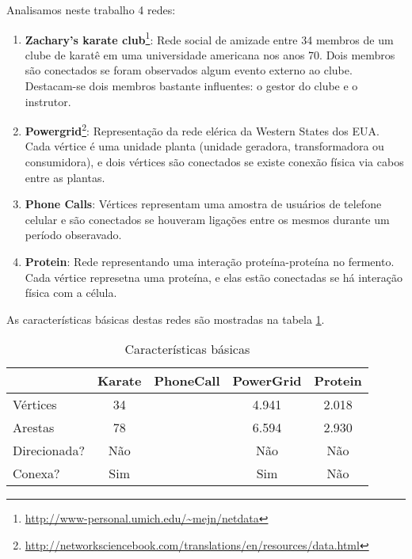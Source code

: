 \documentclass[12pt,a4paper]{article}
\begin{document}
	Analisamos neste trabalho 4 redes:
	\begin{enumerate}
		\item \textbf{Zachary's karate club}\footnote{\url{http://www-personal.umich.edu/~mejn/netdata}}: Rede social de amizade entre 34 membros de um clube de karatê em uma universidade americana nos anos 70. Dois membros são conectados se foram observados algum evento externo ao clube. Destacam-se dois membros bastante influentes: o gestor do clube e o instrutor.
		
		\item \textbf{Powergrid}\footnote{\url{http://networksciencebook.com/translations/en/resources/data.html}}: Representação da rede elérica da Western States dos EUA. Cada vértice é uma unidade planta (unidade geradora, transformadora ou consumidora), e dois vértices são conectados se existe conexão física via cabos entre as plantas.
		
		\item \textbf{Phone Calls}\footnotemark[2]: Vértices representam uma amostra de usuários de telefone celular e são conectados se houveram ligações entre os mesmos durante um período obseravado.

		\item \textbf{Protein}\footnotemark[2]: Rede representando uma interação proteína-proteína no fermento. Cada vértice represetna uma proteína,  e elas estão conectadas se há interação física com a célula.

	\end{enumerate}
	
	As características básicas destas redes são mostradas na tabela \ref{tab:basico}.
	
	\begin{table}[H]
		\caption{Características básicas}
		\label{tab:basico}
		\centering
		\begin{tabular}{l|c|c|c|c}
			& \textbf{Karate} & \textbf{PhoneCall} & \textbf{PowerGrid} & \textbf{Protein}   \\  \hline
			Vértices     & 34              &                    & 4.941              & 2.018              \\ \hline
			Arestas      & 78              &                    & 6.594              & 2.930              \\ \hline
			Direcionada? & Não             &                    & Não                & Não               \\ \hline
			Conexa?      & Sim             &                    & Sim                & Não               
		\end{tabular}
	\end{table}
\end{document}
